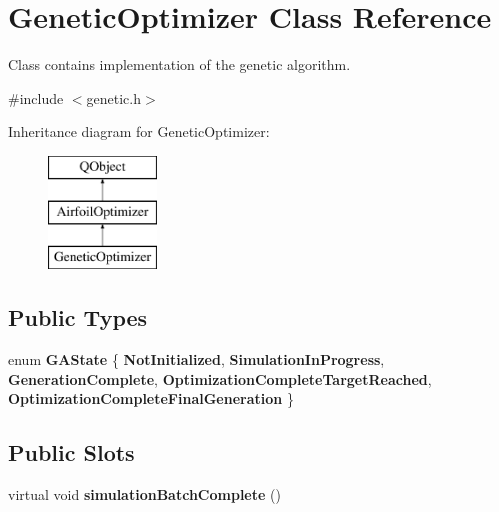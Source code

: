 \hypertarget{class_genetic_optimizer}{}\section{Genetic\+Optimizer Class Reference}
\label{class_genetic_optimizer}


Class contains implementation of the genetic algorithm.  




{\ttfamily \#include $<$genetic.\+h$>$}

Inheritance diagram for Genetic\+Optimizer\+:\begin{figure}[H]
\begin{center}
\leavevmode
\includegraphics[height=3.000000cm]{class_genetic_optimizer}
\end{center}
\end{figure}
\subsection*{Public Types}
\begin{DoxyCompactItemize}
\item 
\hypertarget{class_genetic_optimizer_aa91faeb519e387199da6988e60f4a135}{}\label{class_genetic_optimizer_aa91faeb519e387199da6988e60f4a135} 
enum {\bfseries G\+A\+State} \{ \newline
{\bfseries Not\+Initialized}, 
{\bfseries Simulation\+In\+Progress}, 
{\bfseries Generation\+Complete}, 
{\bfseries Optimization\+Complete\+Target\+Reached}, 
\newline
{\bfseries Optimization\+Complete\+Final\+Generation}
 \}
\end{DoxyCompactItemize}
\subsection*{Public Slots}
\begin{DoxyCompactItemize}
\item 
\hypertarget{class_genetic_optimizer_ad7fcac7f513d98f81eb91f27a5a20313}{}\label{class_genetic_optimizer_ad7fcac7f513d98f81eb91f27a5a20313} 
virtual void {\bfseries simulation\+Batch\+Complete} ()
\end{DoxyCompactItemize}
